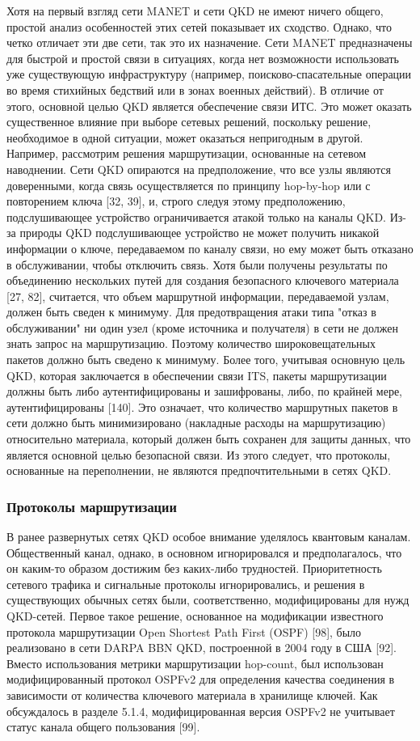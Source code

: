 Хотя на первый взгляд сети MANET и сети QKD не имеют ничего общего, простой анализ особенностей этих сетей показывает их сходство. Однако, что четко отличает эти две сети, так это их назначение. Сети MANET предназначены для быстрой и простой связи в ситуациях, когда нет возможности использовать уже существующую инфраструктуру (например, поисково-спасательные операции во время стихийных бедствий или в зонах военных действий). В отличие от этого, основной целью QKD является обеспечение связи ИТС. Это может оказать существенное влияние при выборе сетевых решений, поскольку решение, необходимое в одной ситуации, может оказаться непригодным в другой. Например, рассмотрим решения маршрутизации, основанные на сетевом наводнении. Сети QKD опираются на предположение, что все узлы являются доверенными, когда связь осуществляется по принципу hop-by-hop или с повторением ключа [32, 39], и, строго следуя этому предположению, подслушивающее устройство ограничивается атакой только на каналы QKD. Из-за природы QKD подслушивающее устройство не может получить никакой информации о ключе, передаваемом по каналу связи, но ему может быть отказано в обслуживании, чтобы отключить связь. Хотя были получены результаты по объединению нескольких путей для создания безопасного ключевого материала [27, 82], считается, что объем маршрутной информации, передаваемой узлам, должен быть сведен к минимуму. Для предотвращения атаки типа "отказ в обслуживании" ни один узел (кроме источника и получателя) в сети не должен знать запрос на маршрутизацию. Поэтому количество широковещательных пакетов должно быть сведено к минимуму. Более того, учитывая основную цель QKD, которая заключается в обеспечении связи ITS, пакеты маршрутизации должны быть либо аутентифицированы и зашифрованы, либо, по крайней мере, аутентифицированы [140]. Это означает, что количество маршрутных пакетов в сети должно быть минимизировано (накладные расходы на маршрутизацию) относительно материала, который должен быть сохранен для защиты данных, что является основной целью безопасной связи. Из этого следует, что протоколы, основанные на переполнении, не являются предпочтительными в сетях QKD.
\subsubsection*{Протоколы маршрутизации}
В ранее развернутых сетях QKD особое внимание уделялось квантовым каналам. Общественный канал, однако, в основном игнорировался и предполагалось, что он каким-то образом достижим без каких-либо трудностей. Приоритетность сетевого трафика и сигнальные протоколы игнорировались, и решения в существующих обычных сетях были, соответственно, модифицированы для нужд QKD-сетей. Первое такое решение, основанное на модификации известного протокола маршрутизации Open Shortest Path First (OSPF) [98], было реализовано в сети DARPA BBN QKD, построенной в 2004 году в США [92]. Вместо использования метрики маршрутизации hop-count, был использован модифицированный протокол OSPFv2 для определения качества соединения в зависимости от количества ключевого материала в хранилище ключей. Как обсуждалось в разделе 5.1.4, модифицированная версия OSPFv2 не учитывает статус канала общего пользования [99].

